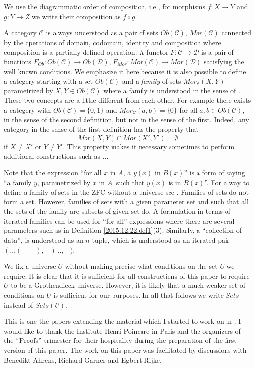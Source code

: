 \documentclass[12pt]{amsart}
\newcommand{\sr}{\rightarrow}
\newcommand{\C}{{\mathcal C}}
\newcommand{\D}{{\mathcal D}}
\begin{document}
We use the diagrammatic order of composition, i.e., for morphisms $f:X\sr Y$ and $g:Y\sr Z$ we write their composition as $f\circ g$. 

A category $\C$ is always understood as a pair of sets $Ob(\C)$, $Mor(\C)$ connected by the operations of domain, codomain, identity and composition where composition is a partially defined operation. A functor $F:\C\sr \D$ is a pair of functions $F_{Ob}:Ob(\C)\sr Ob(\D)$, $F_{Mor}:Mor(\C)\sr Mor(\D)$ satisfying the well known conditions. We emphasize it here because it is also possible to define a category starting with a set $Ob(\C)$ and a {\em family} of sets $Mor_{\C}(X,Y)$ parametrized by $X,Y\in Ob(\C)$ where a {family} is understood in the sense of \cite[Remark 3.9]{fromunivwithPiI}. These two concepts are a little different from each other. For example there exists a category with $Ob(\C)=\{0,1\}$ and $Mor_{\C}(a,b)=\{0\}$ for all $a,b\in Ob(\C)$, in the sense of the second definition, but not in the sense of the first. Indeed, any category in the sense of the first definition has the property that 
%
$$Mor(X,Y)\cap Mor(X',Y')=\emptyset$$
%
if $X\ne X'$ or $Y\ne Y'$. This property makes it necessary sometimes to perform additional constructions such as ... %


Note that the expression ``for all $x$ in $A$, a $y(x)$ in $B(x)$'' is a form of saying ``a family $y$, parametrized by $x$ in $A$, such that  $y(x)$ is in $B(x)$''. For a way to define a family of sets in the ZFC without a universe see \cite[Remark 3.9]{fromunivwithPiI}. Families of sets do not form a set. However, families of sets with a given parameter set and such that all the sets of the family are subsets of given set do. A formulation in terms of iterated families can be used for ``for all'' expressions where there are  several parameters such as in Definition  \ref{2015.12.22.def1}(3). Similarly, a ``collection of data'', is understood as an $n$-tuple, which is understood as an iterated pair $(\dots(-,-),-)\dots,-)$.





We fix a universe $U$ without making precise what conditions on the set $U$ we require. It is clear that it is sufficient for all constructions of this paper to require $U$ to be a Grothendieck universe. However, it is likely that a much weaker set of conditions on $U$ is sufficient for our purposes. In all that follows we write $Sets$ instead of $Sets(U)$.  

This is one the papers extending the material which I started to work on in \cite{NTS}. I would like to thank the Institute Henri Poincare in Paris and the organizers of the ``Proofs'' trimester for their hospitality during the preparation of the first version of this paper. The work on this paper was facilitated by discussions with Benedikt Ahrens, Richard Garner and Egbert Rijke.  
\end{document}
